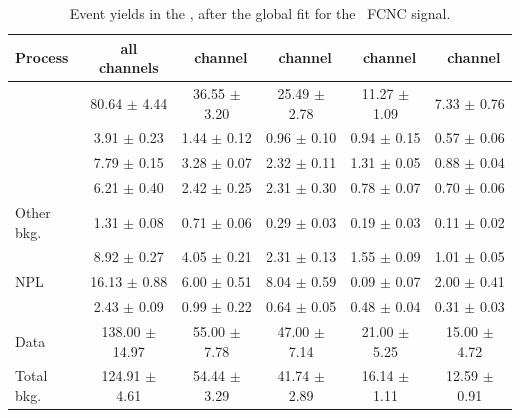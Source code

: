 \begin{landscape}	
	\vspace*{\fill}
	
	\begin{table}[htbp]
		\centering
		\caption{Event yields in the \STSR, after the global fit for the \Zut\ FCNC signal. }
		
		\begin{tabular} {l c c c c c   }
			\toprule
			Process &   all channels & \mumumu\ channel & \emumu\ channel & \eemu\ channel &\eee\ channel\\
			\midrule
			\NPL\ \DY    & 80.64  $ \pm $  4.44& 36.55 $ \pm $ 3.20& 25.49 $\pm$ 2.78 & 11.27 $\pm$ 1.09 & 7.33 $\pm$ 0.76 \\ 
			\ttZ         & 3.91 $ \pm $ 0.23 & 1.44 $ \pm $ 0.12   &  0.96 $\pm$ 0.10 &  0.94 $\pm$ 0.15 & 0.57 $\pm$ 0.06\\ 
			\WZ          & 7.79 $ \pm $ 0.15 & 3.28 $ \pm $ 0.07   &  2.32 $\pm$ 0.11 &  1.31 $\pm$ 0.05 & 0.88 $\pm$ 0.04\\ 
			\ZZ 		 & 6.21 $ \pm $ 0.40 & 2.42 $ \pm $ 0.25   &  2.31 $\pm$ 0.30 &  0.78 $\pm$ 0.07 & 0.70 $\pm$ 0.06 \\ 
			Other bkg.   & 1.31 $ \pm $ 0.08 & 0.71 $ \pm $ 0.06   &  0.29 $\pm$ 0.03 &  0.19 $\pm$ 0.03 & 0.11 $\pm$ 0.02 \\ 
			\tZq 		 & 8.92 $ \pm $ 0.27 & 4.05 $ \pm $ 0.21   &  2.31 $\pm$ 0.13 &  1.55 $\pm$ 0.09 & 1.01 $\pm$ 0.05\\ 
			NPL \ttbar   &16.13 $ \pm $ 0.88 & 6.00 $ \pm $ 0.51   &  8.04 $\pm$ 0.59 &  0.09 $\pm$ 0.07 & 2.00 $\pm$ 0.41 \B\\
			\hdashline
			\kZut  		 & 2.43 $ \pm $ 0.09 & 0.99 $ \pm $ 0.22   &  0.64 $\pm$ 0.05 &  0.48 $\pm$ 0.04 & 0.31 $\pm$ 0.03 \T\B \\
			\hdashline
			Data         & 138.00 $ \pm $ 14.97 & 55.00 $\pm$ 7.78 & 47.00 $\pm$ 7.14 & 21.00 $\pm$ 5.25 & 15.00 $\pm$ 4.72 \T\\
			Total bkg.   & 124.91 $ \pm $  4.61 & 54.44 $\pm$ 3.29 & 41.74 $\pm$ 2.89 & 16.14 $\pm$ 1.11 & 12.59 $\pm$ 0.91 \\
			\bottomrule
		\end{tabular}
		\label{tab:PYieldSTSR}
	\end{table}
	\vspace*{\fill}
\end{landscape}
